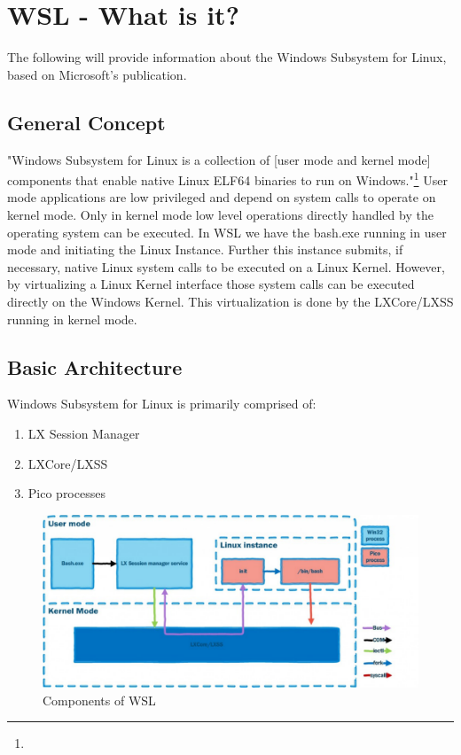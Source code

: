 \documentclass[utf8,biblatex, ngerman, english]{lni}
\begin{document}
\section{WSL - What is it?}
The following will provide information about the Windows Subsystem for Linux, based on Microsoft's publication.

\subsection{General Concept}
"Windows Subsystem for Linux is a collection of [user mode and kernel mode] components that enable native Linux ELF64 binaries to run on Windows."\footnote{} User mode applications are low privileged and depend on system calls to operate on kernel mode. Only in kernel mode low level operations directly handled by the operating system can be executed. In WSL we have the bash.exe running in user mode and initiating the Linux Instance. Further this instance submits, if necessary, native Linux system calls to be executed on a Linux Kernel. However, by virtualizing a Linux Kernel interface those system calls can be executed directly on the Windows Kernel. This virtualization is done by the LXCore/LXSS running in kernel mode.\cite{WSL16}

\subsection{Basic Architecture}



Windows Subsystem for Linux is primarily comprised of: 
\begin{enumerate}
    \item LX Session Manager
    \item LXCore/LXSS
    \item Pico processes\cite{WSL16}
\end{enumerate}

\begin{figure}
  \centering
  \includegraphics[width=1\textwidth]{WSL Architecture.pdf}
  \caption{Components of WSL}
  \label{img:architecture}
\end{figure}
\end{document}
